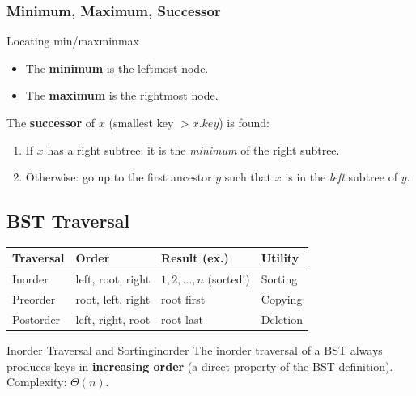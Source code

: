 \subsubsection{Minimum, Maximum, Successor}

\begin{theorem}{Locating min/max}{minmax}
\begin{itemize}[noitemsep]
  \item The \textbf{minimum} is the leftmost node.
  \item The \textbf{maximum} is the rightmost node.
\end{itemize}
\end{theorem}

The \textbf{successor} of $x$ (smallest key $> x.\mathit{key}$) is found:
\begin{enumerate}[noitemsep]
  \item If $x$ has a right subtree: it is the \emph{minimum} of the right subtree.
  \item Otherwise: go up to the first ancestor $y$ such that $x$ is in the \emph{left} 
        subtree of $y$.
\end{enumerate}

\subsection{BST Traversal}

\begin{center}
\renewcommand{\arraystretch}{1.3}
\begin{tabular}{llll}
\toprule
\textbf{Traversal} & \textbf{Order} & \textbf{Result (ex.)} & \textbf{Utility} \\
\midrule
Inorder     & left, root, right & $1,2,\ldots,n$ (sorted!) & Sorting \\
Preorder    & root, left, right & root first & Copying \\
Postorder   & left, right, root & root last & Deletion \\
\bottomrule
\end{tabular}
\end{center}

\begin{remark}{Inorder Traversal and Sorting}{inorder}
The inorder traversal of a BST always produces keys in \textbf{increasing order}
(a direct property of the BST definition). Complexity: $\Theta(n)$.
\end{remark}


